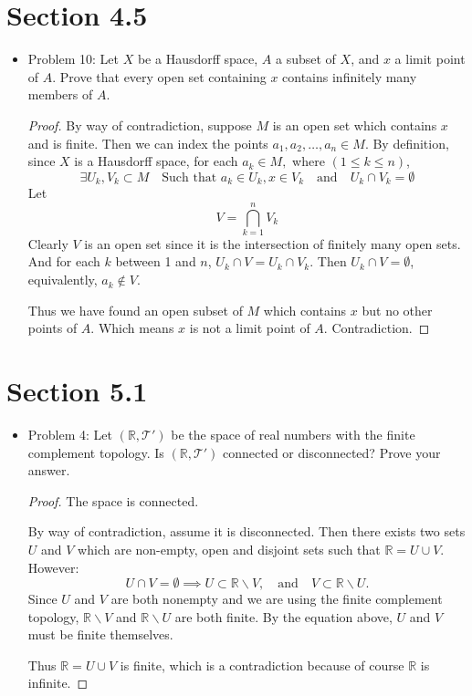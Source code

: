 \documentclass[hidelinks,12pt]{article}
\title{\scalebox{2}{Math 551 Homework 5}}
\author{\scalebox{1.5}{Theo Koss}}
\date{November 2021}
\theoremstyle{definition}
\renewcommand{\skip}{\par\null\par}
\newcommand{\T}{\mathcal T}
\newcommand{\R}{\mathbb{R}}
\begin{document}
\maketitle
\section{Section 4.5}
\begin{itemize}
    \item Problem 10: Let $X$ be a Hausdorff space, $A$ a subset of $X$, and $x$ a limit point of $A$. Prove that every open set containing $x$ contains infinitely many members of $A$.\begin{proof} By way of contradiction, suppose $M$ is an open set which contains $x$ and is finite. Then we can index the points $a_1,a_2,\dots,a_n\in M$. By definition, since $X$ is a Hausdorff space, for each $a_k\in M,$ where $(1\leq k\leq n)$, $$\exists U_k,V_k\subset M\quad\text{Such that }a_k\in U_k,x\in V_k\quad\text{and}\quad U_k\cap V_k=\emptyset$$Let $$V=\bigcap_{k=1}^nV_k$$ Clearly $V$ is an open set since it is the intersection of finitely many open sets. And for each $k$ between 1 and $n$, $U_k\cap V=U_k\cap V_k$. Then $U_k\cap V=\emptyset$, equivalently, $a_k\notin V$.\skip Thus we have found an open subset of $M$ which contains $x$ but no other points of $A$. Which means $x$ is not a limit point of $A$. Contradiction.
    \end{proof}
\end{itemize}
\section{Section 5.1}
\begin{itemize}
    \item Problem 4: Let $(\R,\T')$ be the space of real numbers with the finite complement topology. Is $(\R,\T')$ connected or disconnected? Prove your answer.\begin{proof}The space is connected.\skip By way of contradiction, assume it is disconnected. Then there exists two sets $U$ and $V$ which are non-empty, open and disjoint sets such that $\R=U\cup V$. However: $$U\cap V=\emptyset\implies U\subset\R\backslash V,\quad\text{and}\quad V\subset\R\backslash U.$$ Since $U$ and $V$ are both nonempty and we are using the finite complement topology, $\R\backslash V$ and $\R\backslash U$ are both finite. By the equation above, $U$ and $V$ must be finite themselves.\skip Thus $\R=U\cup V$ is finite, which is a contradiction because of course $\R$ is infinite.
    \end{proof}
\end{itemize}
\end{document}
